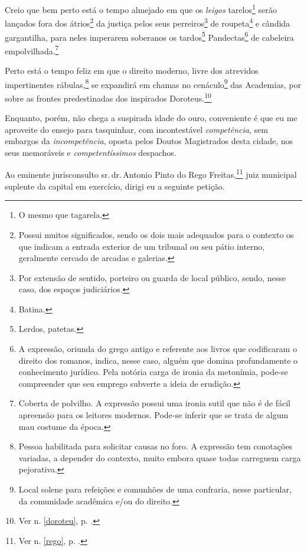 Creio que bem perto está o tempo almejado em que os \emph{leigos}
tarelos\footnote{O mesmo que tagarela.} serão lançados fora dos
átrios\footnote{Possui muitos significados, sendo os dois mais
  adequados para o contexto os que indicam a entrada exterior de um
  tribunal ou seu pátio interno, geralmente cercado de arcadas e
  galerias.} da justiça pelos seus perreiros\footnote{Por extensão de
  sentido, porteiro ou guarda de local público, sendo, nesse caso, dos
  espaços judiciários.} de roupeta\footnote{Batina.} e cândida
gargantilha, para neles imperarem soberanos os tardos\footnote{Lerdos,
  patetas.} Pandectas\footnote{A expressão, oriunda do grego antigo e
  referente aos livros que codificaram o direito dos romanos, indica,
  nesse caso, alguém que domina profundamente o conhecimento jurídico.
  Pela notória carga de ironia da metonímia, pode-se compreender que seu
  emprego subverte a ideia de erudição.} de cabeleira
empolvilhada.\footnote{Coberta de polvilho. A expressão possui uma
  ironia sutil que não é de fácil apreensão para os leitores modernos.
  Pode-se inferir que se trata de algum mau costume da época.}

Perto está o tempo feliz em que o direito moderno, livre dos atrevidos
impertinentes rábulas,\footnote{Pessoa habilitada para solicitar causas
  no foro. A expressão tem conotações variadas, a depender do contexto,
  muito embora quase todas carreguem carga pejorativa.} se expandirá em
chamas no cenáculo\footnote{Local solene para refeições e comunhões de
  uma confraria, nesse particular, da comunidade acadêmica e/ou do
  direito.} das Academias, por sobre as frontes predestinadas dos
inspirados Doroteus.\footnote{Ver n. \ref{doroteu}, p. \pageref{doroteu}.}

Enquanto, porém, não chega a suspirada idade do ouro, conveniente é que
eu me aproveite do ensejo para tasquinhar, com incontestável
\emph{competência}, sem embargos da \emph{incompetência}, oposta pelos
Doutos Magistrados desta cidade, nos seus memoráveis e
\emph{competentíssimos} despachos.

Ao eminente jurisconsulto sr.\,dr.\,Antonio Pinto do Rego
Freitas,\footnote{Ver n. \ref{rego}, p. \pageref{rego}.}
juiz municipal suplente da capital em exercício, dirigi 
eu a seguinte petição.

